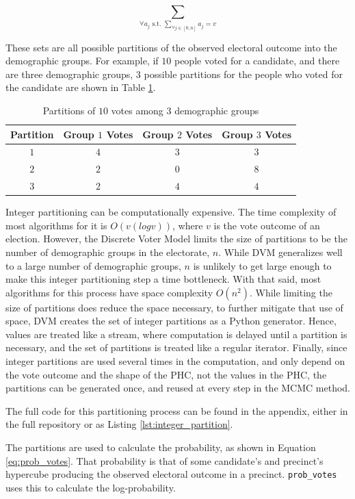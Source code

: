 $$\sum_{\forall a_j \text{ s.t. } \sum_{\forall j \in [0, n]} a_j = v}$$

These sets are all possible partitions of the observed electoral outcome into the demographic groups. For example, if $10$ people voted for a candidate, and there are three demographic groups, $3$ possible partitions for the people who voted for the candidate are shown in Table \ref{table:partitions}.

\begin{table}[!h]
 \centering
 \caption{Partitions of $10$ votes among $3$ demographic groups}
 \label{table:partitions}
 \begin{tabular}{|c|c|c|c|}
   \hline
    Partition & Group $1$ Votes & Group $2$ Votes & Group $3$ Votes \\\hline
    $1$ & $4$ & $3$ & $3$  \\
    $2$ & $2$ & $0$ & $8$  \\
    $3$ & $2$ & $4$ & $4$  \\
    \hline
 \end{tabular}
\end{table}

Integer partitioning can be computationally expensive. The time complexity of most algorithms for it is $O(v (log v))$, where $v$ is the vote outcome of an election. However, the Discrete Voter Model limits the size of partitions to be the number of demographic groups in the electorate, $n$. While DVM generalizes well to a large number of demographic groups, $n$ is unlikely to get large enough to make this integer partitioning step a time bottleneck. With that said, most algorithms for this process have space complexity $O(n^2)$. While limiting the size of partitions does reduce the space necessary, to further mitigate that use of space, DVM creates the set of integer partitions as a Python generator. Hence, values are treated like a stream, where computation is delayed until a partition is necessary, and the set of partitions is treated like a regular iterator. Finally, since integer partitions are used several times in the computation, and only depend on the vote outcome and the shape of the PHC, not the values in the PHC, the partitions can be generated once, and reused at every step in the MCMC method.

The full code for this partitioning process can be found in the appendix, either in the full repository or as Listing \ref{lst:integer_partition}.

The partitions are used to calculate the probability, as shown in Equation \ref{eq:prob_votes}. That probability is that of some candidate's and precinct's hypercube producing the observed electoral outcome in a precinct. \texttt{prob\_votes} uses this to calculate the log-probability.


